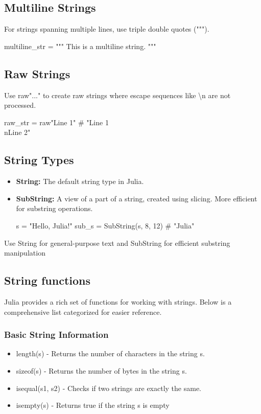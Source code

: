 \documentclass{report}
\begin{document}
    \subsection{Multiline Strings}
    \bigbreak \noindent 
    For strings spanning multiple lines, use triple double quotes (""").
    \bigbreak \noindent 
    \begin{jlcode}
        multiline_str = """
        This is a
        multiline string.
        """
    \end{jlcode}

    \bigbreak \noindent 
    \subsection{Raw Strings}
    \bigbreak \noindent 
    Use raw"..." to create raw strings where escape sequences like \textbackslash n are not processed.
    \bigbreak \noindent 
    \begin{jlcode}
    raw_str = raw"Line 1"  # "Line 1\\nLine 2"
    \end{jlcode}
    \bigbreak \noindent 
    \subsection{String Types}
    \bigbreak \noindent 
    \begin{itemize}
        \item \textbf{String:} The default string type in Julia.
        \item \textbf{SubString:} A view of a part of a string, created using slicing. More efficient for substring operations.
            \bigbreak \noindent 
            \begin{jlcode}
                s = "Hello, Julia!"
                sub_s = SubString(s, 8, 12)  # "Julia"
            \end{jlcode}
    \end{itemize}
    \bigbreak \noindent 
    Use String for general-purpose text and SubString for efficient substring manipulation

    \bigbreak \noindent 
    \subsection{String functions}
    \bigbreak \noindent 
    Julia provides a rich set of functions for working with strings. Below is a comprehensive list categorized for easier reference.
    \bigbreak \noindent 
    \subsubsection{Basic String Information}
    \begin{itemize}
        \item length(s) - Returns the number of characters in the string s.
        \item sizeof(s) - Returns the number of bytes in the string s.
        \item isequal(s1, s2) - Checks if two strings are exactly the same.
        \item isempty(s) - Returns true if the string s is empty
    \end{itemize}
\end{document}
